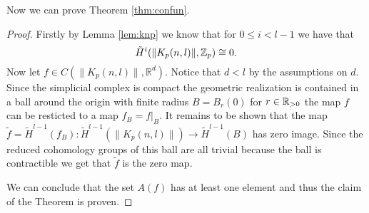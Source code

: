 Now we can prove Theorem \ref{thm:confun}.
\begin{proof}
  Firstly by Lemma \ref{lem:knp} we know that for $0 \leq i < l-1$ we have that \[\tilde{H}^i(\lVert K_p(n,l) \rVert, \mathbb{Z}_p) \cong 0.\] Now let $f\in C(\lVert K_p(n,l) \rVert, \mathbb{R}^d)$. Notice that $d < l$ by the assumptions on $d$. Since the simplicial complex is compact the geometric realization is contained in a ball around the origin with finite radius $B = B_r(0)$ for $r \in \mathbb{R}_{>0}$ the map $f$ can be resticted to a map $f_B = f|_B$. It remains to be shown that the map $\tilde{f} = \tilde{H}^{l-1}(f_B)\colon \tilde{H}^{l-1}(\lVert K_p(n,l) \rVert) \to \tilde{H}^{l-1}(B)$ has zero image.
  Since the reduced cohomology groups of this ball are all trivial because the ball is contractible we get that $\tilde{f}$ is the zero map.

  We can conclude that the set $A(f)$ has at least one element and thus the claim of the Theorem is proven.
\end{proof}

